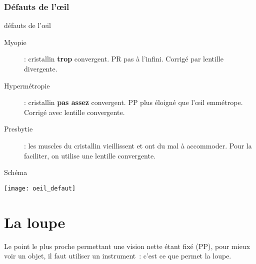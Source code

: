 \documentclass[../main/main.tex]{subfiles}
\begin{document}
\subsubsection{Défauts de l'œil}
\begin{tcbraster}[raster columns=2, raster equal height=rows]
    \begin{defi}[label=def:defaut_oeil]{défauts de l'œil}
        \begin{description}
            \item[Myopie] : cristallin \textbf{trop} convergent. PR pas à
                l'infini. Corrigé par lentille divergente.
            \item[Hypermétropie] : cristallin \textbf{pas assez} convergent. PP
                plus éloigné que l'œil emmétrope. Corrigé avec lentille
                convergente.
            \item[Presbytie] : les muscles du cristallin vieillissent et ont du
                mal à accommoder. Pour la faciliter, on utilise une lentille
                convergente.
        \end{description}
    \end{defi}
    \begin{NCexem}[width=\linewidth]{Schéma}
        \begin{center}
            \texttt{[image: oeil\_defaut]}
            \label{fig:oeil_defaut}
        \end{center}
    \end{NCexem}
\end{tcbraster}

\section{La loupe}
Le point le plus proche permettant une vision nette étant fixé (PP), pour mieux
voir un objet, il faut utiliser un instrument~: c'est ce que permet la loupe.
\end{document}
